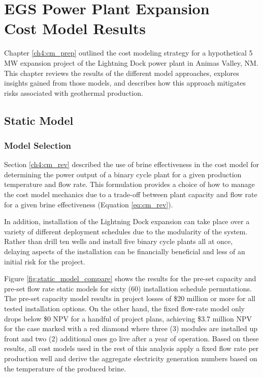 \chapter{EGS Power Plant Expansion\\Cost Model Results}\label{ch6:cm_results}

Chapter \ref{ch4:cm_prep} outlined the cost modeling strategy for a hypothetical 5 MW expansion project of the Lightning Dock power plant in Animas Valley, NM. This chapter reviews the results of the different model approaches, explores insights gained from those models, and describes how this approach mitigates risks associated with geothermal production.

\section{Static Model}
\label{ch6:static_mod}

\subsection{Model Selection}
\label{ch6:static_select}

Section \ref{ch4:cm_rev} described the use of brine effectiveness in the cost model for determining the power output of a binary cycle plant for a given production temperature and flow rate. This formulation provides a choice of how to manage the cost model mechanics due to a trade-off between plant capacity and flow rate for a given brine effectiveness (Equation \ref{eq:cm_rev}).

In addition, installation of the Lightning Dock expansion can take place over a variety of different deployment schedules due to the modularity of the system. Rather than drill ten wells and install five binary cycle plants all at once, delaying aspects of the installation can be financially beneficial and less of an initial risk for the project.

Figure \ref{fig:static_model_compare} shows the results for the pre-set capacity and pre-set flow rate static models for sixty (60) installation schedule permutations. The pre-set capacity model results in project losses of \$20 million or more for all tested installation options. On the other hand, the fixed flow-rate model only drops below \$0 NPV for a handful of project plans, achieving \$3.7 million NPV for the case marked with a red diamond where three (3) modules are installed up front and two (2) additional ones go live after a year of operation. Based on these results, all cost models used in the rest of this analysis apply a fixed flow rate per production well and derive the aggregate electricity generation numbers based on the temperature of the produced brine.

